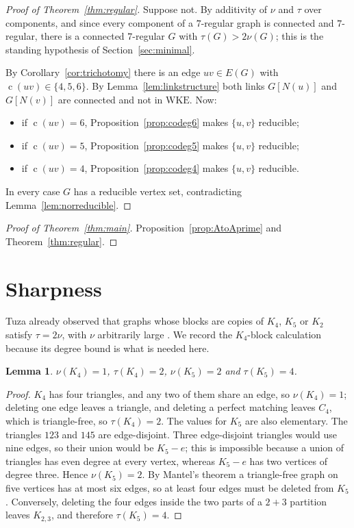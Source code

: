 \documentclass[11pt,a4paper]{amsart}
\theoremstyle{plain}
\newtheorem{lemma}[theorem]{Lemma}
\theoremstyle{definition}
\newcommand{\WKE}{\mathrm{WKE}}
\newcommand{\cod}{\operatorname{c}}
\newcommand{\N}{N}
\begin{document}
\begin{proof}[Proof of Theorem~\ref{thm:regular}]
Suppose not. By additivity of $\nu$ and $\tau$ over components, and since
every component of a $7$-regular graph is connected and $7$-regular, there is
a connected $7$-regular $G$ with $\tau(G)>2\nu(G)$; this is the standing
hypothesis of Section~\ref{sec:minimal}.

By Corollary~\ref{cor:trichotomy} there is an edge $uv\in E(G)$ with
$\cod(uv)\in\{4,5,6\}$. By Lemma~\ref{lem:linkstructure} both links
$G[\N(u)]$ and $G[\N(v)]$ are connected and not in $\WKE$. Now:
\begin{itemize}
  \item if $\cod(uv)=6$, Proposition~\ref{prop:codeg6} makes $\{u,v\}$
    reducible;
  \item if $\cod(uv)=5$, Proposition~\ref{prop:codeg5} makes $\{u,v\}$
    reducible;
  \item if $\cod(uv)=4$, Proposition~\ref{prop:codeg4} makes $\{u,v\}$
    reducible.
\end{itemize}
In every case $G$ has a reducible vertex set, contradicting
Lemma~\ref{lem:norreducible}.
\end{proof}

\begin{proof}[Proof of Theorem~\ref{thm:main}]
Proposition~\ref{prop:AtoAprime} and Theorem~\ref{thm:regular}.
\end{proof}

\section{Sharpness}\label{sec:sharp}

Tuza already observed that graphs whose blocks are copies of $K_4$, $K_5$ or
$K_2$ satisfy $\tau=2\nu$, with $\nu$ arbitrarily large
\cite[pp.~373--374]{Tuza1990}. We record the $K_4$-block calculation because
its degree bound is what is needed here.

\begin{lemma}\label{lem:k4k5}
$\nu(K_4)=1$, $\tau(K_4)=2$, $\nu(K_5)=2$ and $\tau(K_5)=4$.
\end{lemma}

\begin{proof}
$K_4$ has four triangles, and any two of them share an edge, so $\nu(K_4)=1$;
deleting one edge leaves a triangle, and deleting a perfect matching leaves
$C_4$, which is triangle-free, so $\tau(K_4)=2$. The values for $K_5$ are
also elementary. The triangles $123$ and $145$ are edge-disjoint. Three
edge-disjoint triangles would use nine edges, so their union would be
$K_5-e$; this is impossible because a union of triangles has even degree at
every vertex, whereas $K_5-e$ has two vertices of degree three. Hence
$\nu(K_5)=2$. By Mantel's theorem a triangle-free graph on five vertices has
at most six edges, so at least four edges must be deleted from $K_5$.
Conversely, deleting the four edges inside the two parts of a $2+3$ partition
leaves $K_{2,3}$, and therefore $\tau(K_5)=4$.
\end{proof}
\end{document}
